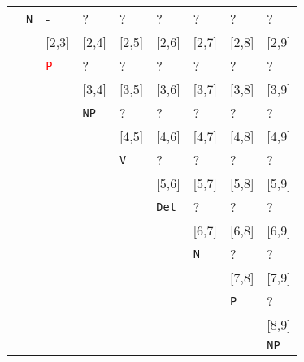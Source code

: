\documentclass[a4paper]{article}
\begin{document}
\begin{enumerate}
\begin{enumerate}
\begin{enumerate}
\begin{itemize}
\begin{table}[hp]
\begin{tabular}{ccccccccc}
 & \multicolumn{1}{|l|}{\texttt{N}} & \multicolumn{1}{l|}{-} & \multicolumn{1}{l|}{?} & \multicolumn{1}{l|}{?} & \multicolumn{1}{l|}{?} & \multicolumn{1}{l|}{?} & \multicolumn{1}{l|}{?} & \multicolumn{1}{l|}{?} \\
\cline{2-9}
 & & \multicolumn{1}{|l|}{[2,3]} & \multicolumn{1}{l|}{[2,4]} & \multicolumn{1}{l|}{[2,5]} & \multicolumn{1}{l|}{[2,6]} & \multicolumn{1}{l|}{[2,7]} & \multicolumn{1}{l|}{[2,8]} & \multicolumn{1}{l|}{[2,9]} \\
 & & \multicolumn{1}{|l|}{\textcolor{red}{\texttt{P}}} & \multicolumn{1}{l|}{?} & \multicolumn{1}{l|}{?} & \multicolumn{1}{l|}{?} & \multicolumn{1}{l|}{?} & \multicolumn{1}{l|}{?} & \multicolumn{1}{l|}{?} \\
\cline{3-9}
 & & & \multicolumn{1}{|l|}{[3,4]} & \multicolumn{1}{l|}{[3,5]} & \multicolumn{1}{l|}{[3,6]} & \multicolumn{1}{l|}{[3,7]} & \multicolumn{1}{l|}{[3,8]} & \multicolumn{1}{l|}{[3,9]} \\
 & & & \multicolumn{1}{|l|}{\texttt{NP}} & \multicolumn{1}{l|}{?} & \multicolumn{1}{l|}{?} & \multicolumn{1}{l|}{?} & \multicolumn{1}{l|}{?} & \multicolumn{1}{l|}{?} \\
\cline{4-9}
 & & & & \multicolumn{1}{|l|}{[4,5]} & \multicolumn{1}{l|}{[4,6]} & \multicolumn{1}{l|}{[4,7]} & \multicolumn{1}{l|}{[4,8]} & \multicolumn{1}{l|}{[4,9]} \\
 & & & & \multicolumn{1}{|l|}{\texttt{V}} & \multicolumn{1}{l|}{?} & \multicolumn{1}{l|}{?} & \multicolumn{1}{l|}{?} & \multicolumn{1}{l|}{?} \\
\cline{5-9}
 & & & & & \multicolumn{1}{|l|}{[5,6]} & \multicolumn{1}{l|}{[5,7]} & \multicolumn{1}{l|}{[5,8]} & \multicolumn{1}{l|}{[5,9]} \\
 & & & & & \multicolumn{1}{|l|}{\texttt{Det}} & \multicolumn{1}{l|}{?} & \multicolumn{1}{l|}{?} & \multicolumn{1}{l|}{?} \\
\cline{6-9}
 & & & & & & \multicolumn{1}{|l|}{[6,7]} & \multicolumn{1}{l|}{[6,8]} & \multicolumn{1}{l|}{[6,9]} \\
 & & & & & & \multicolumn{1}{|l|}{\texttt{N}} & \multicolumn{1}{l|}{?} & \multicolumn{1}{l|}{?} \\
\cline{7-9}
 & & & & & & & \multicolumn{1}{|l|}{[7,8]} & \multicolumn{1}{l|}{[7,9]} \\
 & & & & & & & \multicolumn{1}{|l|}{\texttt{P}} & \multicolumn{1}{l|}{?} \\
\cline{8-9}
 & & & & & & & & \multicolumn{1}{|l|}{[8,9]} \\
 & & & & & & & & \multicolumn{1}{|l|}{\texttt{NP}} \\

\end{tabular}
\end{table}
\end{itemize}
\end{enumerate}
\end{enumerate}
\end{enumerate}
\end{document}
